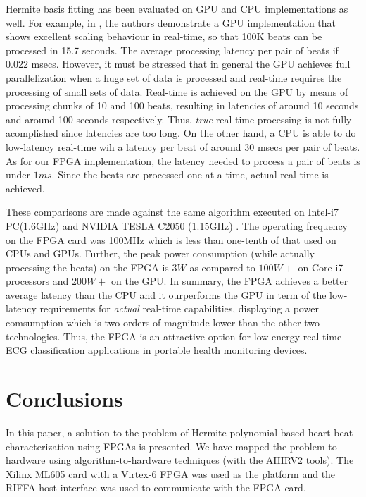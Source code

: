 \documentclass[conference]{IEEEtran}
\begin{document}
Hermite basis fitting has been evaluated on GPU and CPU implementations
as well.  For example, in \cite{c:GPU}, the authors demonstrate a
GPU implementation that shows excellent scaling behaviour in real-time, so that 
100K beats can be processed in 15.7 seconds. The average processing latency per 
pair of beats if 0.022 msecs.  However, it must be stressed that in general the GPU achieves 
full parallelization when a huge set of data is processed and real-time requires the processing 
of small sets of data. Real-time is achieved on the GPU by means of processing chunks of 10 and 100 beats, 
resulting in latencies of around 10 seconds and around 100 seconds respectively. Thus, 
{\em true} real-time processing is not fully acomplished since latencies are too long. 
On the other hand, a CPU is able to do low-latency real-time wih a latency per beat of around 
30 msecs per pair of beats.  As for our FPGA implementation, the latency needed to process a pair of beats 
is under $1ms$. Since the beats are processed one at a time, actual real-time is achieved. 

These comparisons are made against the same algorithm executed on Intel-i7 PC(1.6GHz) 
and NVIDIA TESLA C2050 (1.15GHz) \cite{c:GPU}. The operating frequency on the FPGA
card was 100MHz which is less than one-tenth of that used on CPUs and GPUs.
Further, the peak power consumption (while actually processing the beats) on the FPGA is $3W$ as compared to 
$100W+$ on Core i7 processors and $200W+$ on the GPU.  %
In summary, the FPGA achieves a better average latency than the CPU and it ourperforms the 
GPU in term of the low-latency requirements for \textit{actual} real-time capabilities, 
displaying a power comsumption which is two orders of magnitude lower than the other two technologies. 
Thus, the FPGA is an attractive option for low energy real-time ECG classification
applications in portable health monitoring devices.

\section{Conclusions}\label{s:conclusions}

In this paper, a solution to the problem of Hermite polynomial
based heart-beat characterization using FPGAs is presented.
We have mapped the problem to hardware using algorithm-to-hardware
techniques (with the AHIRV2 tools).  The Xilinx ML605 card with a
Virtex-6 FPGA was used as the platform and the RIFFA host-interface was used to
communicate with the FPGA card. 
\end{document}
